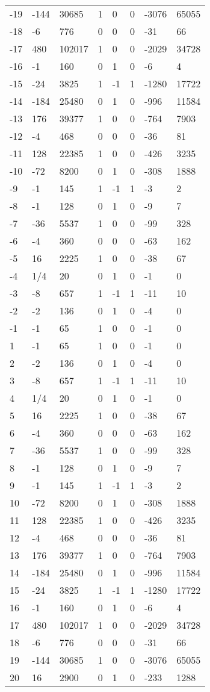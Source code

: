 \documentclass{amsart}
\begin{document}
\begin{longtable}{|l|l|l|lllll|}
-19&-144&30685&1&0&0&-3076&65055\\
-18&-6&776&0&0&0&-31&66\\
-17&480&102017&1&0&0&-2029&34728\\
-16&-1&160&0&1&0&-6&4\\
-15&-24&3825&1&-1&1&-1280&17722\\
-14&-184&25480&0&1&0&-996&11584\\
-13&176&39377&1&0&0&-764&7903\\
-12&-4&468&0&0&0&-36&81\\
-11&128&22385&1&0&0&-426&3235\\
-10&-72&8200&0&1&0&-308&1888\\
-9&-1&145&1&-1&1&-3&2\\
-8&-1&128&0&1&0&-9&7\\
-7&-36&5537&1&0&0&-99&328\\
-6&-4&360&0&0&0&-63&162\\
-5&16&2225&1&0&0&-38&67\\
-4&1/4&20&0&1&0&-1&0\\
-3&-8&657&1&-1&1&-11&10\\
-2&-2&136&0&1&0&-4&0\\
-1&-1&65&1&0&0&-1&0\\
1&-1&65&1&0&0&-1&0\\
2&-2&136&0&1&0&-4&0\\
3&-8&657&1&-1&1&-11&10\\
4&1/4&20&0&1&0&-1&0\\
5&16&2225&1&0&0&-38&67\\
6&-4&360&0&0&0&-63&162\\
7&-36&5537&1&0&0&-99&328\\
8&-1&128&0&1&0&-9&7\\
9&-1&145&1&-1&1&-3&2\\
10&-72&8200&0&1&0&-308&1888\\
11&128&22385&1&0&0&-426&3235\\
12&-4&468&0&0&0&-36&81\\
13&176&39377&1&0&0&-764&7903\\
14&-184&25480&0&1&0&-996&11584\\
15&-24&3825&1&-1&1&-1280&17722\\
16&-1&160&0&1&0&-6&4\\
17&480&102017&1&0&0&-2029&34728\\
18&-6&776&0&0&0&-31&66\\
19&-144&30685&1&0&0&-3076&65055\\
20&16&2900&0&1&0&-233&1288\\

\end{longtable}
\end{document}
